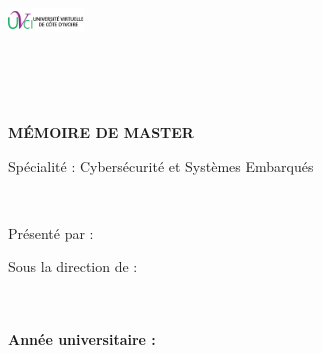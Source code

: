 
\begin{titlepage}
    \centering
    \vspace*{1cm}
    
    \includegraphics[width=0.15\textwidth]{assets/figures/university_logo.png}
    
    \vspace{1cm}
    
    {\large \universite}\\
    {\large \faculte}\\
    {\large \departement}\\
    
    \vspace{2cm}
    
    {\LARGE \textbf{MÉMOIRE DE MASTER}}\\
    
    \vspace{1cm}
    
    {\Large Spécialité : Cybersécurité et Systèmes Embarqués}\\
    
    \vspace{2cm}
    
    {\huge \textbf{\titre}}\\
    
    \vspace{2cm}
    
    {\Large Présenté par : \textbf{\auteur}}\\
    
    \vspace{2cm}
    
    {\large Sous la direction de :}\\
    {\large \textbf{\directeur}}\\
    {\large \textbf{\codirecteur}}\\
    
    \vfill
    
    {\large \textbf{Année universitaire : \annee}}\\
    
\end{titlepage}

\cleardoublepage